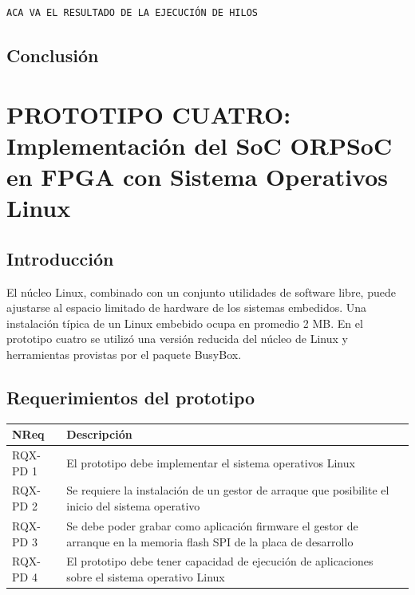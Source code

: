 \begin{lstlisting}[frame=single,caption={Salida de la ejecución del programa de prueba twothreads},label={lst:salhilos}]
 ACA VA EL RESULTADO DE LA EJECUCIÓN DE HILOS
\end{lstlisting}

		\subsection{Conclusión}


	
	\newpage			
	\section{PROTOTIPO CUATRO: Implementación del SoC ORPSoC en FPGA con Sistema Operativos Linux}
		\subsection{Introducción}
		El núcleo Linux, combinado con un conjunto utilidades de software libre, puede ajustarse al espacio limitado de hardware 
	    de los sistemas embedidos. Una instalación típica de un Linux embebido ocupa en promedio 2 MB. En el prototipo cuatro se utilizó una versión
	    reducida del núcleo de Linux y herramientas provistas por el paquete BusyBox. 
		
		\subsection{Requerimientos del prototipo}
		
		\begin{table}[h!]
		\centering	
		\begin{tabular}{ p{2.5cm} p{8cm} p{3cm} }
		\hline 
		\rowcolor[gray]{0.8} N\textordmasculine Req  & Descripción\\
		\hline                             	RQX-PD 1 & El prototipo debe implementar el sistema operativos Linux\\ 
		\hline  							RQX-PD 2 & Se requiere la instalación de un gestor de arraque que posibilite el inicio del sistema operativo\\ 
		\hline 								RQX-PD 3 & Se debe poder grabar como aplicación firmware el gestor de arranque en la memoria flash SPI de la placa de desarrollo\\
		\hline 								RQX-PD 4 & El prototipo debe tener capacidad de ejecución de aplicaciones sobre el sistema operativo Linux\\
		\hline 
		\end{tabular}
		\end{table}
		
